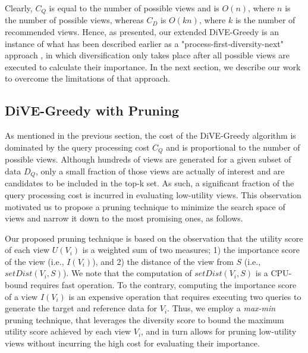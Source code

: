 Clearly, $C_Q$ is equal to the number of possible views and is $O(n)$, where $n$ is the number of possible views, whereas $C_D$ is $O(kn)$, where $k$ is the number of recommended views.
%
Hence, as presented, our extended DiVE-Greedy is an instance of what has been described earlier as a "process-first-diversity-next" approach \cite{Zhang2008,Rafiei2010}, in which diversification only takes place after all possible views are executed to calculate their importance. 
%
In the next section, we describe our work to overcome the limitations of that approach.

\subsection{DiVE-Greedy with Pruning}\label{dive-greedy-static}

As mentioned in the previous section, the cost of the DiVE-Greedy algorithm is dominated by the query processing cost $C_Q$ and is proportional to the number of possible views. 
%
Although hundreds of views are generated for a given subset of data $D_Q$, only a small fraction of those views are actually of interest and are candidates to be included in the top-k set. 
%
As such, a significant fraction of the query processing cost is incurred in evaluating low-utility views. 
%
This observation motivated us to propose a pruning technique to minimize the search space of views and narrow it down to the most promising ones, as follows. 



Our proposed pruning technique is based on the observation that the utility score of each view $U(V_i)$ is a weighted sum of two measures; 1) the importance score of the view (i.e., $I(V_i)$), and 2) the distance of the view from $S$ (i.e., $setDist\left(V_i, S\right) $). 
%
We note that the computation of $setDist\left(V_i, S\right)$ is a CPU-bound requires fast operation. 
%
To the contrary, computing the importance score of a view $I(V_i)$ is an expensive operation that requires executing two queries to generate the target and reference data for $V_i$.
Thus, we employ a {\em max-min} pruning technique, that leverages the diversity score to bound the maximum utility score achieved by each view $V_i$, and in turn allows for pruning low-utility views without incurring the high cost for evaluating their importance.

